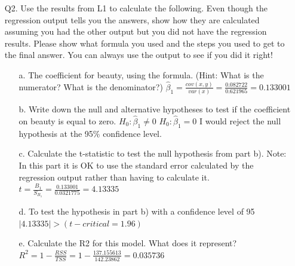\documentclass{article}
\begin{document}
\begin{enumerate}
\newpage
\item[Q2.] Use the results from L1 to calculate the following. Even though the regression output tells you the answers, show how they are calculated assuming you had the other output but you did not have the regression results. Please show what formula you used and the steps you used to get to the final answer. You can always use the output to see if you did it right!
\linebreak
\begin{enumerate}
\item[a.] The coefficient for beauty, using the formula. (Hint: What is the numerator? What is the denominator?)
\newline\newline
$\hat\beta_1 = \frac{cov(x,y)}{var(x)}= \frac{0.082722}{0.621965} = 0.133001$
\newline
\item[b.] Write down the null and alternative hypotheses to test if the coefficient on beauty is equal to zero. 
\newline\newline
${H}_0: \hat\beta_1 \neq 0$
\newline
${H}_0: \hat\beta_1 = 0$
\newline
I would reject the null hypothesis at the 95\% confidence level.
\newline
\item[c.] Calculate the t-statistic to test the null hypothesis from part b). Note: In this part it is OK to use the standard error calculated by the regression output rather than having to calculate it. 
\newline\newline
$t = \frac{B_1}{S_{B_1}} = \frac{0.133001}{0.0321775} = 4.13335$
\newline
\item[d.]To test the hypothesis in part b) with a confidence level of 95%
\newline\newline
$|4.13335| > (t-critical = 1.96)$
\newline
\item[e.] Calculate the R2 for this model. What does it represent? 
\newline\newline
$R^2 = 1 - \frac{RSS}{TSS} = 1 - \frac{137.155613}{142.23862} = 0.035736$
\newline\newline

\end{enumerate}
\end{enumerate}
\end{document}
